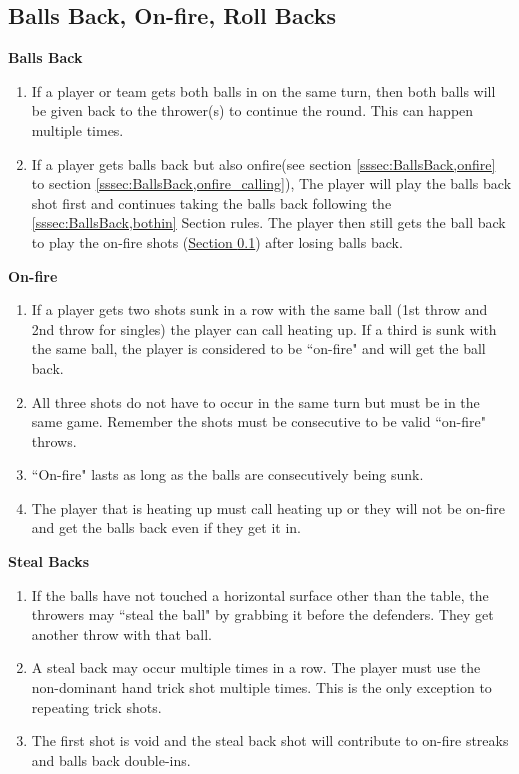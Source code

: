 	\subsection{Balls Back, On-fire, Roll Backs}\label{ssec:BallsBack}
        \noindent\textbf{Balls Back}
        \begin{enumerate}[label=(\roman*)]
            \item \label{sssec:BallsBack,bothin} If a player or team gets both balls in on the same turn, then both balls will be given back to the thrower(s) to continue the round.
                This can happen multiple times.
            \item \label{sssec:BallsBack,onfire_combine} If a player gets balls back but also onfire(see section \ref{sssec:BallsBack,onfire} to section \ref{sssec:BallsBack,onfire_calling}), The player will play the balls back shot first and continues taking the balls back following the \ref{sssec:BallsBack,bothin} Section rules.
                The player then still gets the ball back to play the on-fire shots (\hyperref[ssec:BallsBack]{Section \ref{ssec:BallsBack}}) after losing balls back.
        \end{enumerate}
        \noindent\textbf{On-fire}
        \begin{enumerate}[label=(\roman*)]
            \item \label{sssec:BallsBack,onfire} If a player gets two shots sunk in a row with the same ball (1st throw and 2nd throw for singles) the player can call heating up.
                If a third is sunk with the same ball, the player is considered to be ``on-fire" and will get the ball back. 
            \item \label{sssec:BallsBack,onfire_reset} All three shots do not have to occur in the same turn but must be in the same game. Remember the shots must be consecutive to be valid ``on-fire" throws.
            \item \label{sssec:BallsBack,onfire_multiple} ``On-fire" lasts as long as the balls are consecutively being sunk. 
            \item \label{sssec:BallsBack,onfire_calling} The player that is heating up must call heating up or they will not be on-fire and get the balls back even if they get it in.
        \end{enumerate}
        \noindent\textbf{Steal Backs}
        \begin{enumerate}[label=(\roman*)]
            \item \label{sssec:BallsBack,stealback} If the balls have not touched a horizontal surface other than the table, the throwers may ``steal the ball" by grabbing it before the defenders.
                They get another throw with that ball.
            \item \label{sssec:BallsBack,stealback_multi} A steal back may occur multiple times in a row.
                The player must use the non-dominant hand trick shot multiple times. This is the only exception to repeating trick shots.
            \item \label{sssec:BallsBack,stealback_redo} The first shot is void and the steal back shot will contribute to on-fire streaks and balls back double-ins.
        \end{enumerate}
